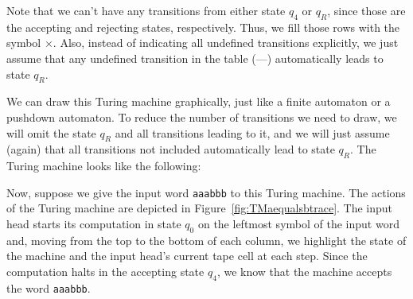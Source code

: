 \begin{example}
Note that we can't have any transitions from either state $q_{4}$ or $q_{R}$, since those are the accepting and rejecting states, respectively. Thus, we fill those rows with the symbol $\times$. Also, instead of indicating all undefined transitions explicitly, we just assume that any undefined transition in the table (---) automatically leads to state $q_{R}$.

We can draw this Turing machine graphically, just like a finite automaton or a pushdown automaton. To reduce the number of transitions we need to draw, we will omit the state $q_{R}$ and all transitions leading to it, and we will just assume (again) that all transitions not included automatically lead to state $q_{R}$. The Turing machine looks like the following:
\begin{center}
\end{center}

Now, suppose we give the input word \texttt{aaabbb} to this Turing machine. The actions of the Turing machine are depicted in Figure~\ref{fig:TMaequalsbtrace}. The input head starts its computation in state $q_{0}$ on the leftmost symbol of the input word and, moving from the top to the bottom of each column, we highlight the state of the machine and the input head's current tape cell at each step. Since the computation halts in the accepting state $q_{4}$, we know that the machine accepts the word \texttt{aaabbb}.
\end{example}

